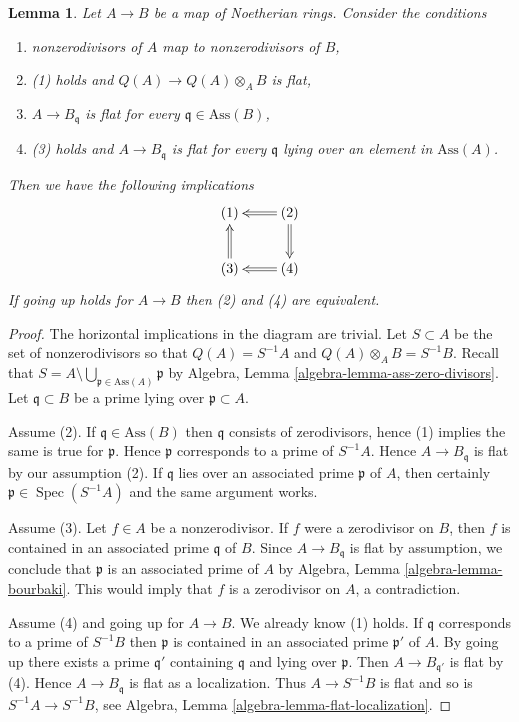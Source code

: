 \documentclass[10pt,a4paper]{amsart}
\theoremstyle{plain}
\newtheorem{lemma}[subsection]{Lemma}
\theoremstyle{definition}
\theoremstyle{remark}
\numberwithin{equation}{subsection}
\def\Spec{\mathop{\mathrm{Spec}}}
\begin{document}
\begin{lemma}
\label{lemma-explain-condition}
Let $A \to B$ be a map of Noetherian rings. Consider the conditions
\begin{enumerate}
\item nonzerodivisors of $A$ map to nonzerodivisors of $B$,
\item (1) holds and $Q(A) \to Q(A) \otimes_A B$ is flat,
\item $A \to B_\mathfrak q$ is flat for every
$\mathfrak q \in \text{Ass}(B)$,
\item (3) holds and $A \to B_\mathfrak q$ is flat for every $\mathfrak q$
lying over an element in $\text{Ass}(A)$.
\end{enumerate}
Then we have the following implications
$$
\xymatrix{
(1) & (2) \ar@{=>}[l] \ar@{=>}[d] \\
(3) \ar@{=>}[u] & (4) \ar@{=>}[l]
}
$$
If going up holds for $A \to B$ then (2) and (4) are equivalent.
\end{lemma}

\begin{proof}
The horizontal implications in the diagram are trivial.
Let $S \subset A$ be the set of nonzerodivisors so that
$Q(A) = S^{-1}A$ and $Q(A) \otimes_A B = S^{-1}B$. Recall that
$S = A \setminus \bigcup_{\mathfrak p \in \text{Ass}(A)} \mathfrak p$
by Algebra, Lemma \ref{algebra-lemma-ass-zero-divisors}.
Let $\mathfrak q \subset B$ be a prime lying over $\mathfrak p \subset A$.

\medskip\noindent
Assume (2). If $\mathfrak q \in \text{Ass}(B)$ then
$\mathfrak q$ consists of zerodivisors, hence (1) implies
the same is true for $\mathfrak p$. Hence
$\mathfrak p$ corresponds to a prime of $S^{-1}A$.
Hence $A \to B_\mathfrak q$ is flat by our assumption (2).
If $\mathfrak q$ lies over an associated prime $\mathfrak p$
of $A$, then certainly $\mathfrak p \in \Spec(S^{-1}A)$ and the
same argument works.

\medskip\noindent
Assume (3). Let $f \in A$ be a nonzerodivisor. If $f$ were a zerodivisor
on $B$, then $f$ is contained in an associated prime $\mathfrak q$
of $B$. Since $A \to B_\mathfrak q$ is flat by assumption, we conclude that
$\mathfrak p$ is an associated prime of $A$ by
Algebra, Lemma \ref{algebra-lemma-bourbaki}. This would imply that
$f$ is a zerodivisor on $A$, a contradiction.

\medskip\noindent
Assume (4) and going up for $A \to B$. We already know (1) holds.
If $\mathfrak q$ corresponds to a prime of $S^{-1}B$ then $\mathfrak p$
is contained in an associated prime $\mathfrak p'$ of $A$. By going up
there exists a prime $\mathfrak q'$ containing $\mathfrak q$ and lying
over $\mathfrak p$. Then $A \to B_{\mathfrak q'}$ is flat by
(4). Hence $A \to B_{\mathfrak q}$ is flat as a localization.
Thus $A \to S^{-1}B$ is flat and so is $S^{-1}A \to S^{-1}B$, see
Algebra, Lemma \ref{algebra-lemma-flat-localization}.
\end{proof}
\end{document}
